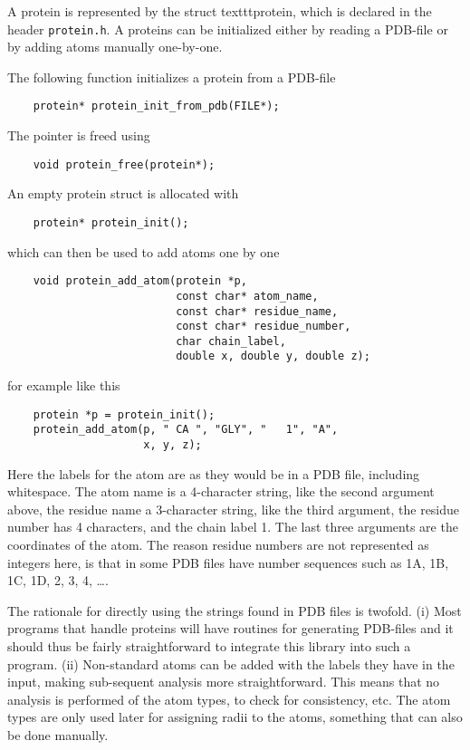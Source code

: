 \documentclass[a4paper,11pt]{article}
\begin{document}
A protein is represented by the struct texttt{protein}, which is
declared in the header \texttt{protein.h}. A proteins can be
initialized either by reading a PDB-file or by adding atoms manually
one-by-one.

The following function initializes a protein from a PDB-file
\begin{verbatim}
    protein* protein_init_from_pdb(FILE*); 
\end{verbatim}
The pointer is freed using
\begin{verbatim}
    void protein_free(protein*);
\end{verbatim}
An empty protein struct is allocated with 
\begin{verbatim}
    protein* protein_init();
\end{verbatim}
which can then be used to add atoms one by one
\begin{verbatim}
    void protein_add_atom(protein *p, 
                          const char* atom_name,
                          const char* residue_name, 
                          const char* residue_number,
                          char chain_label,
                          double x, double y, double z);

\end{verbatim}
for example like this
\begin{verbatim}
    protein *p = protein_init();
    protein_add_atom(p, " CA ", "GLY", "   1", "A",
                     x, y, z);
\end{verbatim}
Here the labels for the atom are as they would be in a PDB file,
including whitespace. The atom name is a 4-character string, like the
second argument above, the residue name a 3-character string, like the
third argument, the residue number has 4 characters, and the chain
label 1. The last three arguments are the coordinates of the atom. The
reason residue numbers are not represented as integers here, is that
in some PDB files have number sequences such as 1A, 1B, 1C, 1D, 2, 3,
4, \ldots.

The rationale for directly using the strings found in PDB files is
twofold. (i) Most programs that handle proteins will have routines for
generating PDB-files and it should thus be fairly straightforward to
integrate this library into such a program. (ii) Non-standard atoms
can be added with the labels they have in the input, making
sub-sequent analysis more straightforward. This means that no analysis
is performed of the atom types, to check for consistency, etc. The
atom types are only used later for assigning radii to the atoms,
something that can also be done manually.
\end{document}
